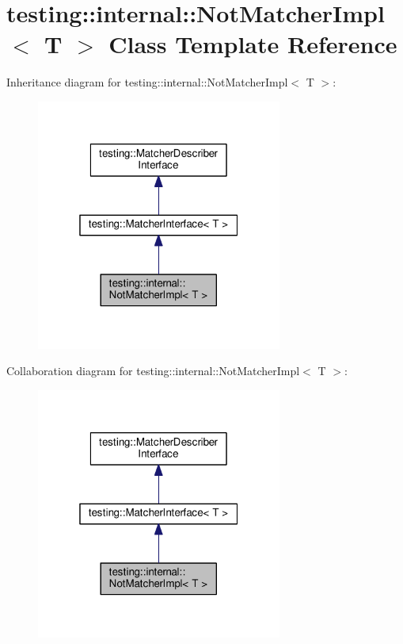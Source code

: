 \hypertarget{classtesting_1_1internal_1_1NotMatcherImpl}{}\section{testing\+:\+:internal\+:\+:Not\+Matcher\+Impl$<$ T $>$ Class Template Reference}
\label{classtesting_1_1internal_1_1NotMatcherImpl}


Inheritance diagram for testing\+:\+:internal\+:\+:Not\+Matcher\+Impl$<$ T $>$\+:\nopagebreak
\begin{figure}[H]
\begin{center}
\leavevmode
\includegraphics[width=229pt]{classtesting_1_1internal_1_1NotMatcherImpl__inherit__graph}
\end{center}
\end{figure}


Collaboration diagram for testing\+:\+:internal\+:\+:Not\+Matcher\+Impl$<$ T $>$\+:\nopagebreak
\begin{figure}[H]
\begin{center}
\leavevmode
\includegraphics[width=229pt]{classtesting_1_1internal_1_1NotMatcherImpl__coll__graph}
\end{center}
\end{figure}
